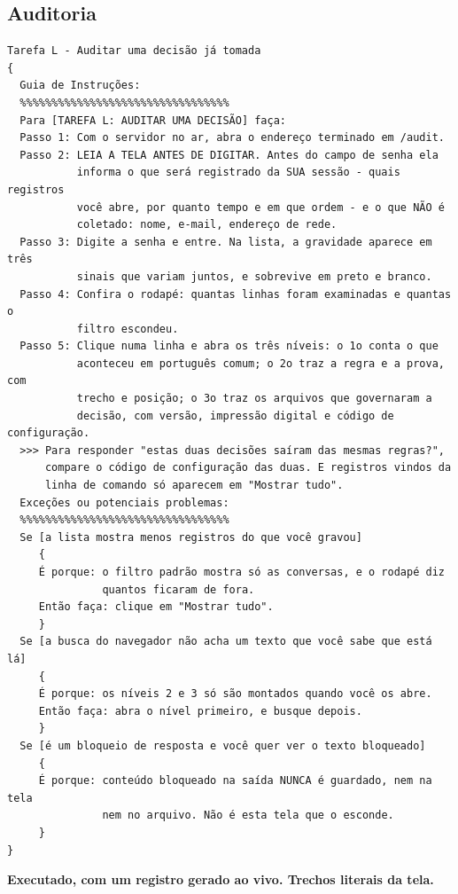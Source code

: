 \documentclass[10pt]{article}
\begin{document}
\subsection{Auditoria}

\begin{lstlisting}
Tarefa L - Auditar uma decisão já tomada
{
  Guia de Instruções:
  %%%%%%%%%%%%%%%%%%%%%%%%%%%%%%%%%
  Para [TAREFA L: AUDITAR UMA DECISÃO] faça:
  Passo 1: Com o servidor no ar, abra o endereço terminado em /audit.
  Passo 2: LEIA A TELA ANTES DE DIGITAR. Antes do campo de senha ela
           informa o que será registrado da SUA sessão - quais registros
           você abre, por quanto tempo e em que ordem - e o que NÃO é
           coletado: nome, e-mail, endereço de rede.
  Passo 3: Digite a senha e entre. Na lista, a gravidade aparece em três
           sinais que variam juntos, e sobrevive em preto e branco.
  Passo 4: Confira o rodapé: quantas linhas foram examinadas e quantas o
           filtro escondeu.
  Passo 5: Clique numa linha e abra os três níveis: o 1o conta o que
           aconteceu em português comum; o 2o traz a regra e a prova, com
           trecho e posição; o 3o traz os arquivos que governaram a
           decisão, com versão, impressão digital e código de configuração.
  >>> Para responder "estas duas decisões saíram das mesmas regras?",
      compare o código de configuração das duas. E registros vindos da
      linha de comando só aparecem em "Mostrar tudo".
  Exceções ou potenciais problemas:
  %%%%%%%%%%%%%%%%%%%%%%%%%%%%%%%%%
  Se [a lista mostra menos registros do que você gravou]
     {
     É porque: o filtro padrão mostra só as conversas, e o rodapé diz
               quantos ficaram de fora.
     Então faça: clique em "Mostrar tudo".
     }
  Se [a busca do navegador não acha um texto que você sabe que está lá]
     {
     É porque: os níveis 2 e 3 só são montados quando você os abre.
     Então faça: abra o nível primeiro, e busque depois.
     }
  Se [é um bloqueio de resposta e você quer ver o texto bloqueado]
     {
     É porque: conteúdo bloqueado na saída NUNCA é guardado, nem na tela
               nem no arquivo. Não é esta tela que o esconde.
     }
}
\end{lstlisting}

\textbf{Executado, com um registro gerado ao vivo. Trechos literais da tela.}
\end{document}

